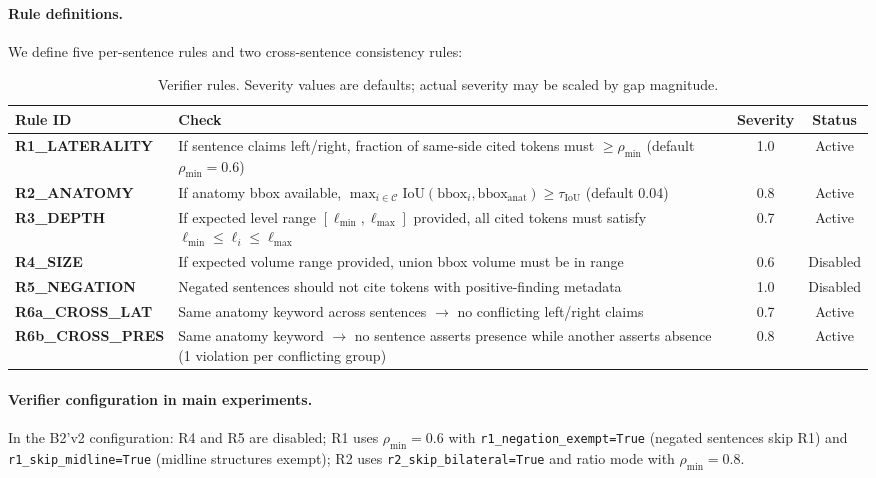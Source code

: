 \documentclass[11pt,a4paper]{article}
\begin{document}
\paragraph{Rule definitions.}
We define five per-sentence rules and two cross-sentence consistency rules:

\begin{table}[H]
\centering\small
\caption{Verifier rules. Severity values are defaults; actual severity may be scaled by gap magnitude.}
\begin{tabular}{lp{7.5cm}cc}
\toprule
Rule ID & Check & Severity & Status \\
\midrule
\textbf{R1\_LATERALITY} & If sentence claims left/right, fraction of same-side cited tokens must $\ge \rho_{\min}$ (default $\rho_{\min}{=}0.6$) & 1.0 & Active \\
\textbf{R2\_ANATOMY} & If anatomy bbox available, $\max_{i \in \mathcal{C}} \mathrm{IoU}(\mathrm{bbox}_i, \mathrm{bbox}_{\mathrm{anat}}) \ge \tau_{\mathrm{IoU}}$ (default 0.04) & 0.8 & Active \\
\textbf{R3\_DEPTH} & If expected level range $[\ell_{\min}, \ell_{\max}]$ provided, all cited tokens must satisfy $\ell_{\min} \le \ell_i \le \ell_{\max}$ & 0.7 & Active \\
\textbf{R4\_SIZE} & If expected volume range provided, union bbox volume must be in range & 0.6 & Disabled \\
\textbf{R5\_NEGATION} & Negated sentences should not cite tokens with positive-finding metadata & 1.0 & Disabled \\
\midrule
\textbf{R6a\_CROSS\_LAT} & Same anatomy keyword across sentences $\to$ no conflicting left/right claims & 0.7 & Active \\
\textbf{R6b\_CROSS\_PRES} & Same anatomy keyword $\to$ no sentence asserts presence while another asserts absence (1 violation per conflicting group) & 0.8 & Active \\
\bottomrule
\end{tabular}
\end{table}

\paragraph{Verifier configuration in main experiments.}
In the B2'v2 configuration: R4 and R5 are disabled; R1 uses $\rho_{\min}{=}0.6$ with \texttt{r1\_negation\_exempt=True} (negated sentences skip R1) and \texttt{r1\_skip\_midline=True} (midline structures exempt); R2 uses \texttt{r2\_skip\_bilateral=True} and ratio mode with $\rho_{\min}{=}0.8$.
\end{document}
